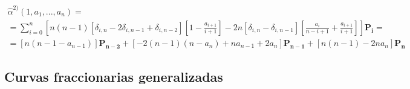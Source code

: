 \documentclass{article}
\begin{document}
\begin{gather*}
\hat{\alpha}^{2)}(1,a_1,...,a_n) = \\
= \sum_{i = 0}^n \left[ n(n-1)\left[ \delta_{i,n} -2\delta_{i,n-1} + \delta_{i,n-2} \right]\left[  1-\frac{a_{i+1}}{i+1}\right] -2n\left[\delta_{i,n} -\delta_{i,n-1} \right] \left[\frac{a_i}{n-i+1} + \frac{a_{i+1}}{i+1} \right] \right] \mathbf{P_i} = \\
= \left[n(n-1-a_{n-1}) \right]\mathbf{P_{n-2}} + \left[-2(n-1)(n-a_n) + na_{n-1} + 2a_n \right]\mathbf{P_{n-1}} + \left[ n(n-1) -2na_n \right]\mathbf{P_n}
\end{gather*}


\subsection{Curvas fraccionarias generalizadas}
\end{document}
